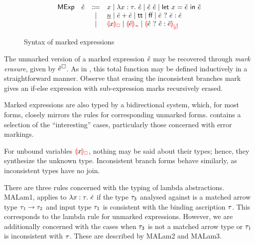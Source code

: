 
\begin{figure}[htbp]
  \[\begin{array}{rrcl}
    \ECMName & \ECMV & \Coloneqq & x \mid \ECLam{x}{\TMV}{\ECMV} \mid \ECAp{\ECMV}{\ECMV} \mid \ECLet{x}{\ECMV}{\ECMV} \\
             &       & \mid         & \ECNumMV \mid \ECPlus{\ECMV}{\ECMV}
                       \mid           \ECTrue \mid \ECFalse \mid \ECIf{\ECMV}{\ECMV}{\ECMV} \\
             &       & \mid         & \ECUnbound{x} \mid \ECInconType{\ECMV} \mid \ECInconBr{\ECMV}{\ECMV}{\ECMV}
  \end{array}\]
  \caption{Syntax of marked expressions}
  \label{fig:calculus-syntax-mexp}
\end{figure}

The unmarked version of a marked expression $\check{e}$ may be recovered through \emph{mark erasure},
given by $\check{e}^{\square}$. As in , this total function may be defined
inductively in a straightforward manner. Observe that erasing the inconsistent branches mark gives
an if-else expression with sub-expression marks recursively erased.



Marked expressions are also typed by a bidirectional system, which, for most forms, closely mirrors
the rules for corresponding unmarked forms.  contains a selection of
the ``interesting'' cases, particularly those concerned with error markings.




For unbound variables $\ECUnbound{x}$, nothing may be said about their types; hence, they synthesize
the unknown type. Inconsistent branch forms behave similarly, as inconsistent types have no join.

There are three rules concerned with the typing of lambda abstractions. MALam1, applies to
$\lambda x : \tau. ~\check{e}$ if the type $\tau_3$ analysed against is a matched arrow type
$\tau_1 \to \tau_2$ and input type $\tau_1$ is consistent with the binding ascription $\tau$.
This corresponds to the lambda rule for unmarked expressions. However, we are additionally concerned
with the cases when $\tau_3$ is not a matched arrow type or $\tau_1$ is inconsistent with $\tau$.
These are described by MALam2 and MALam3.

